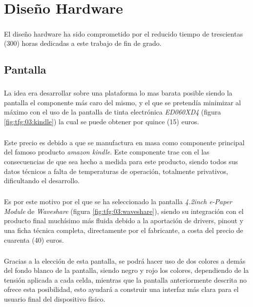 \chapter{Diseño Hardware}
\label{diseño_hardware}

\paragraph{} El diseño hardware ha sido comprometido por el reducido tiempo de trescientas (300) horas dedicadas a este trabajo de fin de grado.

\section{Pantalla}
\paragraph{} La idea era desarrollar sobre una plataforma lo mas barata posible siendo la pantalla el componente más caro del mismo, y el que se pretendía minimizar al máximo con el uso de la pantalla de tinta electrónica \textit{ED060XD4} (figura \ref{fig:tfg:03:kindle}) la cual se puede obtener por quince (15) euros.

\paragraph{} Este precio es debido a que se manufactura en masa como componente principal del famoso producto \textit{amazon kindle}. Este componente trae con el las consecuencias de que sea hecho a medida para este producto, siendo todos sus datos técnicos a falta de temperaturas de operación, totalmente privativos, dificultando el desarrollo.

\paragraph{} Es por este motivo por el que se ha seleccionado la pantalla \textit{4.2inch e-Paper Module} de \textit{Waveshare} (figura \ref{fig:tfg:03:waveshare}), siendo su integración con el producto final muchísimo más fluida debido a la aportación de drivers, pinout y una ficha técnica completa, directamente por el fabricante, a costa del precio de cuarenta (40) euros.

\paragraph{} Gracias a la elección de esta pantalla, se podrá hacer uso de dos colores a demás del fondo blanco de la pantalla, siendo negro y rojo los colores, dependiendo de la tensión aplicada a cada celda, mientras que la pantalla anteriormente descrita no ofrece esta posibilidad, esto ayudará a construir una interfaz más clara para el usuario final del dispositivo físico.

